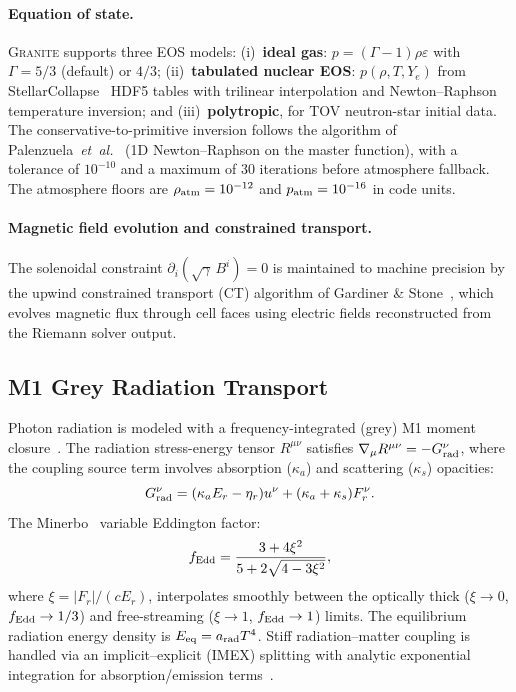 \documentclass[aps,prd,twocolumn,superscriptaddress,nofootinbib,showpacs,
               longbibliography]{revtex4-2}
\newcommand{\granite}{\textsc{Granite}}
\begin{document}
\paragraph{Equation of state.}
\granite{} supports three EOS models:
(i)~\textbf{ideal gas}: $p = (\Gamma-1)\rho\varepsilon$ with $\Gamma = 5/3$
(default) or $4/3$;
(ii)~\textbf{tabulated nuclear EOS}: $p(\rho, T, Y_e)$ from
StellarCollapse~\cite{OConnor2010} HDF5 tables with trilinear interpolation
and Newton--Raphson temperature inversion; and
(iii)~\textbf{polytropic}, for TOV neutron-star initial data.
The conservative-to-primitive inversion follows the algorithm of
Palenzuela~\emph{et~al.}~\cite{Palenzuela2015} (1D Newton--Raphson on the
master function), with a tolerance of $10^{-10}$ and a maximum of
30 iterations before atmosphere fallback.
The atmosphere floors are
$\rho_{\rm atm} = 10^{-12}$ and $p_{\rm atm} = 10^{-16}$ in code units.

\paragraph{Magnetic field evolution and constrained transport.}
The solenoidal constraint $\partial_i(\sqrt{\gamma}\,B^i) = 0$ is maintained
to machine precision by the upwind constrained transport (CT) algorithm of
Gardiner \& Stone~\cite{GardinerStone2005}, which evolves magnetic flux
through cell faces using electric fields reconstructed from the Riemann
solver output.

\subsection{M1 Grey Radiation Transport}
\label{sec:m1_formalism}

Photon radiation is modeled with a frequency-integrated (grey) M1 moment
closure~\cite{Levermore1984,Foucart2015}.
The radiation stress-energy tensor $R^{\mu\nu}$ satisfies
$\nabla_\mu R^{\mu\nu} = -G^\nu_{\rm rad}$, where the coupling source term
involves absorption ($\kappa_a$) and scattering ($\kappa_s$) opacities:
\begin{equation}
  G^\nu_{\rm rad} = (\kappa_a E_r - \eta_r)u^\nu
                  + (\kappa_a + \kappa_s)F^\nu_r.
\end{equation}
The Minerbo~\cite{Minerbo1978} variable Eddington factor:
\begin{equation}
  f_{\rm Edd} = \frac{3 + 4\xi^2}{5 + 2\sqrt{4 - 3\xi^2}},
\end{equation}
where $\xi = |F_r|/(cE_r)$, interpolates smoothly between the optically
thick ($\xi\to 0$, $f_{\rm Edd}\to 1/3$) and free-streaming
($\xi\to 1$, $f_{\rm Edd}\to 1$) limits.
The equilibrium radiation energy density is
$E_{\rm eq} = a_{\rm rad}T^4$.
Stiff radiation--matter coupling is handled via an implicit--explicit (IMEX)
splitting with analytic exponential integration for absorption/emission
terms~\cite{Sadowski2013}.
\end{document}
